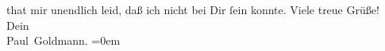                that mir unendlich leid, daß ich nicht bei Dir ſein konnte.\pend
           \pstart
           Viele treue Grüße! {\\[\baselineskip]}Dein {\\[\baselineskip]}\spacefill\mbox{Paul Goldmann.}\pend
           \leftskip=0em{}\endnumbering{}  
      